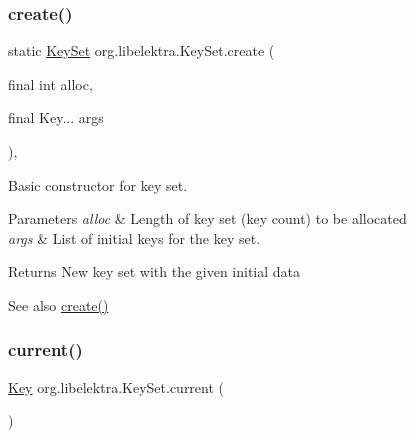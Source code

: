\subsubsection{\texorpdfstring{create()}{create()}\hspace{0.1cm}{\footnotesize\ttfamily [3/3]}}
{\footnotesize\ttfamily static \hyperlink{classorg_1_1libelektra_1_1KeySet}{Key\+Set} org.\+libelektra.\+Key\+Set.\+create (\begin{DoxyParamCaption}\item[{final int}]{alloc,  }\item[{final Key...}]{args }\end{DoxyParamCaption})\hspace{0.3cm}{\ttfamily [inline]}, {\ttfamily [static]}}



Basic constructor for key set. 


\begin{DoxyParams}{Parameters}
{\em alloc} & Length of key set (key count) to be allocated \\
\hline
{\em args} & List of initial keys for the key set. \\
\hline
\end{DoxyParams}
\begin{DoxyReturn}{Returns}
New key set with the given initial data 
\end{DoxyReturn}
\begin{DoxySeeAlso}{See also}
\hyperlink{classorg_1_1libelektra_1_1KeySet_ac0ba4b88bef5e731b586f4ca63b9ab7f}{create()} 
\end{DoxySeeAlso}
\mbox{\label{classorg_1_1libelektra_1_1KeySet_a684ac5513b51d841cc04bdcdb203c4cf}} 
\subsubsection{\texorpdfstring{current()}{current()}}
{\footnotesize\ttfamily \hyperlink{classorg_1_1libelektra_1_1Key}{Key} org.\+libelektra.\+Key\+Set.\+current (\begin{DoxyParamCaption}{ }\end{DoxyParamCaption})\hspace{0.3cm}{\ttfamily [inline]}}



